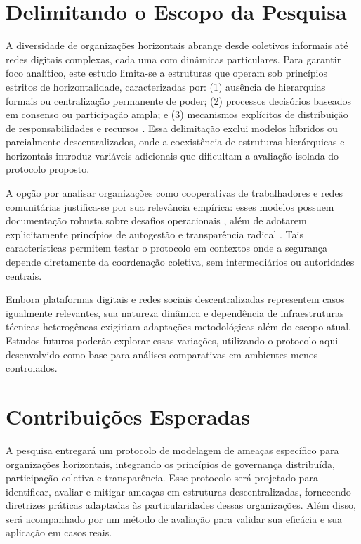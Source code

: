 \section{Delimitando o Escopo da Pesquisa}
\label{sec:delimitacao_escopo}

A diversidade de organizações horizontais abrange desde coletivos informais até
redes digitais complexas, cada uma com dinâmicas particulares. Para garantir
foco analítico, este estudo limita-se a estruturas que operam sob princípios
estritos de horizontalidade, caracterizadas por: (1) ausência de hierarquias
formais ou centralização permanente de poder; (2) processos decisórios baseados
em consenso ou participação ampla; e (3) mecanismos explícitos de distribuição
de responsabilidades e recursos \cite{Colbac}. Essa delimitação exclui modelos
híbridos ou parcialmente descentralizados, onde a coexistência de estruturas
hierárquicas e horizontais introduz variáveis adicionais que dificultam a
avaliação isolada do protocolo proposto.

A opção por analisar organizações como cooperativas de trabalhadores e redes
comunitárias justifica-se por sua relevância empírica: esses modelos possuem
documentação robusta sobre desafios operacionais
\cite{WorkerCooperativesinAmerica}, além de adotarem explicitamente princípios
de autogestão e transparência radical \cite{EverydayRevolutions}. Tais
características permitem testar o protocolo em contextos onde a segurança
depende diretamente da coordenação coletiva, sem intermediários ou autoridades
centrais.

Embora plataformas digitais e redes sociais descentralizadas
\cite{CreatingTheCollectiveSocialMedia} representem casos igualmente relevantes,
sua natureza dinâmica e dependência de infraestruturas técnicas heterogêneas
exigiriam adaptações metodológicas além do escopo atual. Estudos futuros poderão
explorar essas variações, utilizando o protocolo aqui desenvolvido como base
para análises comparativas em ambientes menos controlados.


\section{Contribuições Esperadas} 
\label{sec:contribuicoes_esperadas}

A pesquisa entregará um protocolo de modelagem de ameaças específico para
organizações horizontais, integrando os princípios de governança distribuída,
participação coletiva e transparência. Esse protocolo será projetado para
identificar, avaliar e mitigar ameaças em estruturas descentralizadas,
fornecendo diretrizes práticas adaptadas às particularidades dessas
organizações. Além disso, será acompanhado por um método de avaliação para
validar sua eficácia e sua aplicação em casos reais.

